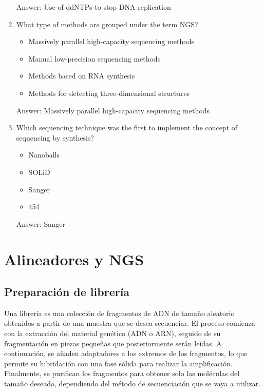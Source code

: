 \begin{enumerate}
Answer: Use of ddNTPs to stop DNA replication

\item What type of methods are grouped under the term NGS?
\begin{itemize}
\item Massively parallel high-capacity sequencing methods
\item Manual low-precision sequencing methods
\item Methods based on RNA synthesis
\item Methods for detecting three-dimensional structures
\end{itemize}

Answer: Massively parallel high-capacity sequencing methods

\item Which sequencing technique was the first to implement the concept of sequencing by synthesis?
\begin{itemize}
\item Nanoballs
\item SOLiD
\item Sanger
\item 454
\end{itemize}

Answer: Sanger
\end{enumerate}

\section{Alineadores y NGS}
\subsection{Preparación de librería}
Una librería es una colección de fragmentos de ADN de tamaño aleatorio obtenidos a partir de una muestra que se desea secuenciar. El proceso comienza con la extracción del material genético (ADN o ARN), seguido de su fragmentación en piezas pequeñas que posteriormente serán leídas. A continuación, se añaden adaptadores a los extremos de los fragmentos, lo que permite su hibridación con una fase sólida para realizar la amplificación. Finalmente, se purifican los fragmentos para obtener solo las moléculas del tamaño deseado, dependiendo del método de secuenciación que se vaya a utilizar.

